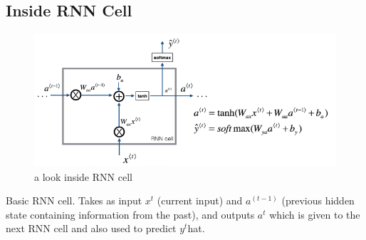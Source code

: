 \subsection{Inside RNN Cell}
\begin{figure}[H]%
    \center%
    \includegraphics[width=.7\textwidth]{images/amir/Capture11.png}
    \caption[RNN Cell]{a look inside RNN cell}\label{fig:RNN inside}%
  \end{figure}
Basic RNN cell. Takes as input $x^t$ (current input) and $a^{(t-1)}$ (previous hidden state containing information from the past), and outputs $a^t$ which is
given to the next RNN cell and also used to predict $y^t$hat.